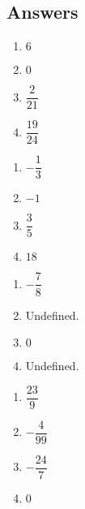 \newpage

\subsection{Answers}

\begin{multicols}{4}
\begin{enumerate}

\item $6$
\item $0$
\item  $\dfrac{2}{21}$
\item  $\dfrac{19}{24}$

\setcounter{HW}{\value{enumi}}
\end{enumerate}
\end{multicols}

\begin{multicols}{4}
\begin{enumerate}
\setcounter{enumi}{\value{HW}}

\item  $-\dfrac{1}{3}$
\item  $-1$
\item  $\dfrac{3}{5}$
\item  $18$

\setcounter{HW}{\value{enumi}}
\end{enumerate}
\end{multicols}

\begin{multicols}{4}
\begin{enumerate}
\setcounter{enumi}{\value{HW}}

\item  $-\dfrac{7}{8}$
\item  Undefined.
\item  $0$
\item  Undefined.

\setcounter{HW}{\value{enumi}}
\end{enumerate}
\end{multicols}



\begin{multicols}{4}
\begin{enumerate}
\setcounter{enumi}{\value{HW}}

\item  $\dfrac{23}{9}$
\item  $-\dfrac{4}{99}$
\item  $-\dfrac{24}{7}$
\item  $0$

\setcounter{HW}{\value{enumi}}
\end{enumerate}
\end{multicols}

